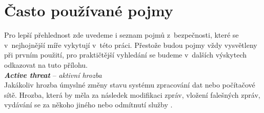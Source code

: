 





\chapter{Často používané pojmy} \label{app:concepts}
Pro lepší přehlednost zde uvedeme i seznam pojmů z~bezpečnosti, které se v~nejhojnější míře vykytují v~této práci. Přestože budou pojmy vždy vysvětleny při prvním použití, pro praktičtější vyhledání se budeme v~dalších výskytech odkazovat na tuto přílohu. \\

\textit{\textbf{Active threat}} -- \textit{aktivní hrozba} \label{app:a:activethreat} \\ %
Jakákoliv hrozba úmyslné změny stavu systému zpracování dat nebo počítačové sítě. Hrozba, která by měla za následek modifikaci zpráv, vložení falešných zpráv, vydávání se za někoho jiného nebo odmítnutí služby \cite[str. 16]{Slovnik2015}. \\

